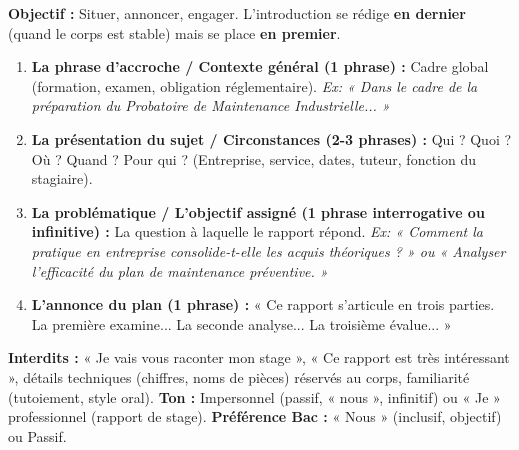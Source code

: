 \documentclass[11pt]{article}
\begin{document}
\begin{methode}
    \textbf{Objectif :} Situer, annoncer, engager. L'introduction se rédige \textbf{en dernier} (quand le corps est stable) mais se place \textbf{en premier}.
    \begin{enumerate}
        \item \textbf{La phrase d'accroche / Contexte général (1 phrase) :} Cadre global (formation, examen, obligation réglementaire). \emph{Ex: « Dans le cadre de la préparation du Probatoire de Maintenance Industrielle... »}
        \item \textbf{La présentation du sujet / Circonstances (2-3 phrases) :} Qui ? Quoi ? Où ? Quand ? Pour qui ? (Entreprise, service, dates, tuteur, fonction du stagiaire).
        \item \textbf{La problématique / L'objectif assigné (1 phrase interrogative ou infinitive) :} La question à laquelle le rapport répond. \emph{Ex: « Comment la pratique en entreprise consolide-t-elle les acquis théoriques ? » ou « Analyser l'efficacité du plan de maintenance préventive. »}
        \item \textbf{L'annonce du plan (1 phrase) :} « Ce rapport s'articule en trois parties. La première examine... La seconde analyse... La troisième évalue... »
    \end{enumerate}
    \textbf{Interdits :} « Je vais vous raconter mon stage », « Ce rapport est très intéressant », détails techniques (chiffres, noms de pièces) réservés au corps, familiarité (tutoiement, style oral).
    \textbf{Ton :} Impersonnel (passif, « nous », infinitif) ou « Je » professionnel (rapport de stage). \textbf{Préférence Bac :} « Nous » (inclusif, objectif) ou Passif.
\end{methode}
\end{document}
